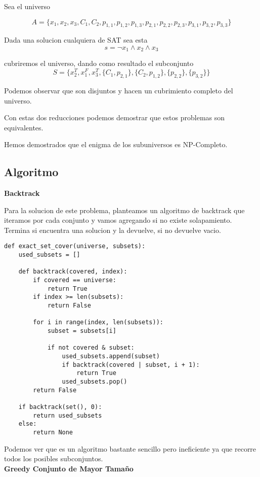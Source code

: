 \documentclass{article}
\begin{document}
Sea el universo

\[A = \{x_1, x_2, x_3, C_1, C_2, p_{1,1}, p_{1,2}, p_{1,3}, p_{2,1}, p_{2,2} ,p_{2,3}, p_{3,1}, p_{3,2}, p_{3,3}\}\]

Dada una solucion cualquiera de SAT sea esta
\[s = \neg x_1 \wedge x_2 \wedge x_3\]

cubriremos el universo, dando como resultado el subconjunto
\[S = \{ x_{2}^{T}, x_{1}^{F}, x_{3}^{T}, \{C_1, p_{2,1}\}, \{C_2, p_{1,2}\}, \{p_{2,2}\}, \{p_{3,2}\} \}\]

 Podemos observar que son disjuntos y hacen un cubrimiento completo del universo.

Con estas dos reducciones podemos demostrar que estos problemas son equivalentes.

Hemos demostrados que el enigma de los subuniversos es NP-Completo.


\subsection{Algoritmo}

\textbf{Backtrack}

Para la solucion de este problema, planteamos un algoritmo de backtrack que iteramos por cada conjunto y vamos agregando si no existe solapamiento. Termina si encuentra una solucion y la devuelve, si no devuelve vacio.

\begin{lstlisting}
def exact_set_cover(universe, subsets):
    used_subsets = []

    def backtrack(covered, index):
        if covered == universe:
            return True
        if index >= len(subsets):
            return False

        for i in range(index, len(subsets)):
            subset = subsets[i]

            if not covered & subset:
                used_subsets.append(subset)
                if backtrack(covered | subset, i + 1):
                    return True
                used_subsets.pop()
        return False

    if backtrack(set(), 0):
        return used_subsets
    else:
        return None
\end{lstlisting}

Podemos ver que es un algoritmo bastante sencillo pero ineficiente ya que recorre todos los posibles subconjuntos.\\

\textbf{Greedy Conjunto de Mayor Tamaño}
\end{document}
